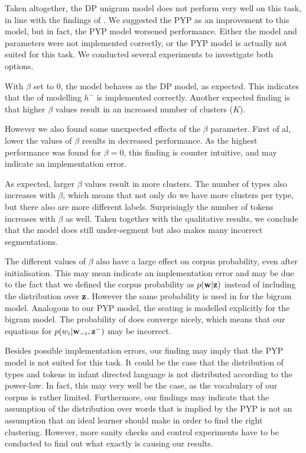 Taken altogether, the DP unigram model does not perform very well on this task, in line with the findings of  \cite{Goldwater200921}. We suggested the PYP as an improvement to this model, but in fact, the PYP model worsened performance. Either the model and parameters were not implemented correctly, or the PYP model is actually not suited for this task. We conducted several experiments to investigate both options.

With $\beta$ set to 0, the model behaves as the DP model, as expected. This indicates that the of modelling $h^-$ is implemented correctly. Another expected finding is that higher $\beta$ values result in an increased number of clusters ($K$). 

However we also found some unexpected effects of the $\beta$ parameter. First of al, lower the values of $\beta$ results in decreased performance. As the highest performance was found for $\beta = 0$, this finding is counter intuitive, and may indicate an implementation error.

As expected, larger $\beta$ values result in more clusters. The number of types also increases with $\beta$, which means that not only do we have more clusters per type, but there also are more different labels. Surprisingly the number of tokens increases with $\beta$ as well. Taken together with the qualitative results, we conclude that the model does still under-segment but also makes many incorrect segmentations.

The different values of $\beta$ also have a large effect on corpus probability, even after initialisation. This may mean indicate an implementation error and may be due to the fact that we defined the corpus probability as $p(\bm{\mathbf{w}}|\bm{\mathbf{z}})$ instead of including the distribution over $\bm{\mathbf{z}}$. However the same probability is used in \cite{Goldwater200921} for the bigram model. Analogous to our PYP model, the seating is modelled explicitly for the bigram model. The probability of \cite{Goldwater200921} does converge nicely, which means that our equations for $p(w_i | \bm{\mathbf{w}}_{-i}, \bm{\mathbf{z}}^-)$ may be incorrect.
 
 Besides possible implementation errors, our finding may imply that the PYP model is not suited for this task. It could be the case that the distribution of types and tokens in infant directed language is not distributed according to the power-law. In fact, this may very well be the case, as the vocabulary of our corpus is rather limited. 
 Furthermore, our findings may indicate that the assumption of the distribution over words that is implied by the PYP is not an assumption that an ideal learner should make in order to find the right clustering. However, more sanity checks and control experiments have to be conducted to find out what exactly is causing our results.